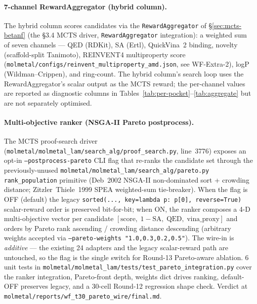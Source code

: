 \paragraph{7-channel RewardAggregator (hybrid column).}
The hybrid column scores candidates via the
\texttt{RewardAggregator} of \S\ref{sec:mcts-betanf} (the §3.4
MCTS driver, \texttt{RewardAggregator} integration): a weighted
sum of seven channels --- QED (RDKit), SA (Ertl),
QuickVina~2 binding, novelty (scaffold-split Tanimoto), REINVENT4
multiproperty score
(\texttt{molmetal/configs/reinvent\_multiproperty\_amd.json}, see
WF-Extra-2), logP (Wildman--Crippen), and ring-count. The hybrid
column's search loop uses the RewardAggregator's scalar output as
the MCTS reward; the per-channel values are reported as
diagnostic columns in Tables~\ref{tab:per-pocket}--\ref{tab:aggregate}
but are not separately optimised.

\paragraph{Multi-objective ranker (NSGA-II Pareto postprocess).}
The MCTS proof-search driver (\texttt{molmetal/molmetal\_lam/search\_alg/proof\_search.py},
line~3776) exposes an opt-in \texttt{--postprocess-pareto} CLI flag
that re-ranks the candidate set through the previously-unused
\texttt{molmetal/molmetal\_lam/search\_alg/pareto.py}
\texttt{rank\_population} primitive (Deb~2002 NSGA-II non-dominated
sort + crowding distance; Zitzler~Thiele~1999 SPEA weighted-sum
tie-breaker). When the flag is OFF (default) the legacy
\texttt{sorted(..., key=lambda p: p[0], reverse=True)} scalar-reward
order is preserved bit-for-bit; when ON, the ranker composes a 4-D
multi-objective vector per candidate
$[\mathrm{score},\; 1-\mathrm{SA},\; \mathrm{QED},\; \mathrm{vina\_proxy}]$
and orders by Pareto rank ascending / crowding distance descending
(arbitrary weights accepted via \texttt{--pareto-weights "1.0,0.3,0.2,0.5"}).
The wire-in is \emph{additive} --- the existing 24 adapters and
the legacy scalar-reward path are untouched, so the flag is the
single switch for Round-13 Pareto-aware ablation. 6 unit tests in
\texttt{molmetal/molmetal\_lam/tests/test\_pareto\_integration.py}
cover the ranker integration, Pareto-front depth, weights dict
drives ranking, default-OFF preserves legacy, and a 30-cell
Round-12 regression shape check. Verdict at
\texttt{molmetal/reports/wf\_t30\_pareto\_wire/final.md}.

